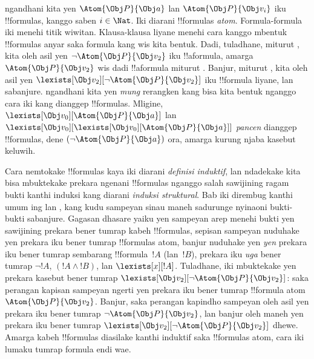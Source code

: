 \documentclass[../../../include/open-logic-section]{subfiles}
\begin{document}
 ngandhani kita yen $\Atom{\Obj P}{\Obj a}$ lan
$\Atom{\Obj P}{\Obj v_i}$ iku !!{formula}s, kanggo saben $i \in
\Nat$. Iki diarani !!{formula}s \emph{atom}. Formula-formula iki
menehi titik wiwitan. Klausa-klausa liyane menehi cara kanggo mbentuk
!!{formula}s anyar saka formula kang wis kita bentuk. Dadi, tuladhane,
miturut , kita oleh asil yen $\lnot \Atom{\Obj P}{\Obj
v_2}$ iku !!a{formula}, amarga $\Atom{\Obj P}{\Obj v_2}$ wis dadi
!!a{formula} miturut . Banjur, miturut
, kita oleh asil yen $\lexists[\Obj v_2][\lnot
\Atom{\Obj P}{\Obj v_2}]$ iku !!{formula} liyane, lan sabanjure.
 ngandhani kita yen \emph{mung} rerangken kang bisa
kita bentuk nganggo cara iki kang dianggep !!{formula}s. Mligine,
$\lexists[\Obj v_0][\Atom{\Obj P}{\Obj a}]$ lan $\lexists[\Obj
  v_0][\lexists[\Obj v_0][\Atom{\Obj P}{\Obj a}]]$ \emph{pancen}
dianggep !!{formula}s, dene $(\lnot \Atom{\Obj P}{\Obj a})$ ora,
amarga kurung njaba kasebut keluwih.

Cara nemtokake !!{formula}s kaya iki diarani \emph{definisi
induktif}, lan ndadekake kita bisa mbuktekake prekara ngenani
!!{formula}s nganggo salah sawijining ragam bukti kanthi induksi kang
diarani \emph{induksi struktural}. Bab iki dirembug kanthi umum ing
 lan , kang kudu
sampeyan sinau maneh sadurunge nyinaoni bukti-bukti sabanjure. Gagasan
dhasare yaiku yen sampeyan arep menehi bukti yen sawijining prekara
bener tumrap kabeh !!{formula}s, sepisan sampeyan nuduhake yen prekara
iku bener tumrap !!{formula}s atom, banjur nuduhake yen \emph{yen}
prekara iku bener tumrap sembarang !!{formula}~$!A$ (lan~$!B$), prekara
iku \emph{uga} bener tumrap $\lnot !A$, $(!A \land !B)$, lan
$\lexists[x][!A]$. Tuladhane, iki mbuktekake yen prekara kasebut bener
tumrap $\lexists[\Obj v_2][\lnot \Atom{\Obj P}{\Obj v_2}]$: saka
perangan kapisan sampeyan ngerti yen prekara iku bener tumrap
!!{formula} atom~$\Atom{\Obj P}{\Obj v_2}$. Banjur, saka perangan
kapindho sampeyan oleh asil yen prekara iku bener tumrap $\lnot
\Atom{\Obj P}{\Obj v_2}$, lan banjur oleh maneh yen prekara iku bener
tumrap $\lexists[\Obj v_2][\lnot \Atom{\Obj P}{\Obj v_2}]$ dhewe.
Amarga kabeh !!{formula}s diasilake kanthi induktif saka !!{formula}s
atom, cara iki lumaku tumrap formula endi wae.
\end{document}
